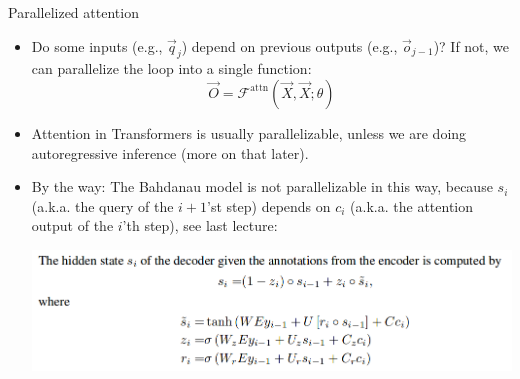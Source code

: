 
\begin{vbframe}{Parallelized attention}

\vfill

\begin{itemize}
\item Do some inputs (e.g., $\vec q_j$) depend on previous outputs (e.g., $\vec o_{j-1}$)? If not, we can parallelize the loop into a single function:
$$\vec O = \mathcal{F}^\mathrm{attn}(\vec X, \vec X; \theta)$$
\item Attention in Transformers is usually parallelizable, unless we are doing autoregressive inference (more on that later).
\item By the way: The Bahdanau model is not parallelizable in this way, because $s_i$ (a.k.a. the query of the $i+1$'st step) depends on $c_i$ (a.k.a. the attention output of the $i$'th step), see last lecture:
\begin{center}
\includegraphics[width=.9\textwidth]{figure/bahdanau3}
\end{center}
\end{itemize}

\vfill

\end{vbframe}


